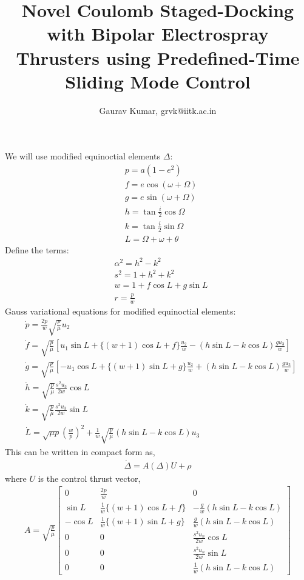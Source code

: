 \documentclass[]{article}
\title{Novel Coulomb Staged-Docking with Bipolar Electrospray Thrusters using Predefined-Time Sliding Mode Control
	}
\author{Gaurav Kumar, grvk@iitk.ac.in}
\theoremstyle{remark}
\theoremstyle{definition}
\begin{document}
	\maketitle
	We will use modified equinoctial elements $\Delta$:
	\begin{align}
		&p = a(1-e^2)\\
		&f = e\cos{(\omega+ \Omega)} \\
		&g = e\sin{(\omega+\Omega)} \\
		&h= \tan{\frac{i}{2}}\cos{\Omega}\\
		&k = \tan{\frac{i}{2}}\sin{\Omega}\\
		&L = \Omega+\omega+\theta
	\end{align}
	Define the terms:
	\begin{align}
		&\alpha^2 = h^2-k^2\\
		&s^2 = 1 + h^2 + k^2\\
		&w = 1 + f\cos{L} + g\sin{L}\\
		&r = \frac{p}{w}
	\end{align}
	Gauss variational equations for modified equinoctial elements: 
	\begin{align}
		&\dot p = \frac{2p}{w}\sqrt{\frac{p}{\mu}} u_2\\
		&\dot f = \sqrt{\frac{p}{\mu}}\left[u_1\sin{L} + \{(w+1)\cos{L} + f\}\frac{u_2}{w} - (h\sin{L} - k\cos{L})\frac{gu_3}{w} \right]\\
		&\dot g = \sqrt{\frac{p}{\mu}}\left[-u_1\cos{L} + \{(w+1)\sin{L} + g\}\frac{u_2}{w} + (h\sin{L} - k\cos{L})\frac{gu_3}{w} \right]\\ 
		&\dot h = \sqrt{\frac{p}{\mu}}\frac{s^2u_3}{2w}\cos{L}\\
		&\dot k = \sqrt{\frac{p}{\mu}}\frac{s^2u_3}{2w}\sin{L}\\
		&\dot L = 
		\sqrt{\mu p}\left(\frac{w}{p}\right)^2 + \frac{1}{w}\sqrt{\frac{p}{\mu}}(h\sin{L}-k\cos{L})u_3
	\end{align}
	This can be written in compact form as,
	\begin{align}
		\dot \Delta = A(\Delta)U + \rho
	\end{align}
	where $U$ is the control thrust vector, 
	\begin{align}
		A = \sqrt{\frac{p}{\mu}}\begin{bmatrix} 0 & \frac{2p}{w} & 0\\ \sin{L} &\frac{1 }{w}\{(w+1)\cos{L} + f\} & -\frac{g}{w}(h\sin{L} - k\cos{L}) \\
			-\cos{L} & \frac{1}{w}\{(w+1)\sin{L} + g\} & \frac{g}{w}(h\sin{L} - k\cos{L}) \\
			0 & 0& \frac{s^2u_n}{2w}\cos{L}\\
			0 & 0 & \frac{s^2u_n}{2w}\sin{L} \\
			0 & 0 & \frac{1}{w}(h\sin{L}-k\cos{L})
		\end{bmatrix}
	\end{align}
\end{document}
